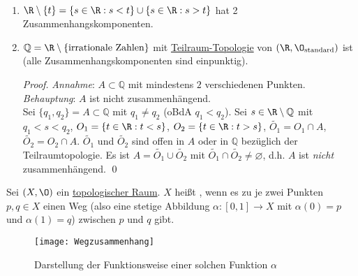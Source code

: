 \begin{example}
  \
  \begin{enumerate}
    \item \( \R \setminus \{ t \} = \{ s \in \R : s < t \} \cup \{ s \in \R : s > t \} \) hat 2 Zusammenhangskomponenten.
    \item \( \mathbb{Q} = \R \setminus \{ \text{irrationale Zahlen} \} \) mit \hyperref[def:teilraumtopologie]{Teilraum-Topologie} von \( (\R, \O_\text{standard}) \) ist  (alle Zusammenhangskomponenten sind einpunktig). \\
    \begin{proof}
      \emph{Annahme}: \( A \subset \mathbb{Q} \) mit mindestens \( 2 \) verschiedenen Punkten. \\
      \emph{Behauptung}: \( A \) ist nicht zusammenhängend. \\
      Sei \( \{ q_1, q_2 \} = A \subset \mathbb{Q} \) mit \( q_1 \neq q_2 \) (oBdA \( q_1 < q_2 \)). Sei \( s \in \R \setminus \mathbb{Q} \) mit \( q_1 < s < q_2 \), \( O_1 = \{ t \in \R: t < s \} \), \( O_2 = \{ t \in \R : t > s \} \), \( \widetilde{O_1} = O_1 \cap A \), \( \widetilde{O_2} = O_2 \cap A \). \( \widetilde{O_1} \) und \( \widetilde{O_2} \) sind offen in \( A \) oder in \( \mathbb{Q} \) bezüglich der Teilraumtopologie. Es ist \( A = \widetilde{O_1} \cup \widetilde{O_2} \) mit \( \widetilde{O_1} \cap \widetilde{O_2} \neq \varnothing \), d.h. \( A \) ist \emph{nicht} zusammenhängend. \qed{}
    \end{proof}
  \end{enumerate}
\end{example}

\begin{definition}[Weg-Zusammenhängend]\label{def:wegzusammenhaengend}
  Sei \( (X, \O) \) ein \hyperref[def:topologie]{topologischer Raum}. \( X \) heißt , wenn es zu je zwei Punkten \( p, q \in X \) einen Weg (also eine stetige Abbildung \( \alpha : [0,1] \to X \) mit \( \alpha(0) = p \) und \( \alpha(1) = q \)) zwischen \( p \) und \( q \) gibt.
  \begin{figure}[H]
    \texttt{[image: Wegzusammenhang]}
    \caption{Darstellung der Funktionsweise einer solchen Funktion \( \alpha \)}
  \end{figure}
\end{definition}

